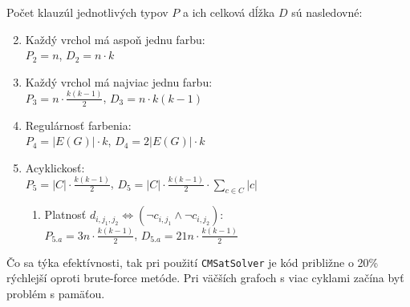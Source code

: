 \documentclass[11pt]{article}
\begin{document}
Počet klauzúl jednotlivých typov $P$ a ich celková dĺžka $D$ sú nasledovné:
\begin{enumerate}
    \setcounter{enumi}{1}
    \item Každý vrchol má aspoň jednu farbu:\\
    $P_2 = n$, $D_2 = n \cdot k$

    \item Každý vrchol má najviac jednu farbu:\\
    $P_3 = n \cdot \frac{k(k-1)}{2}$, $D_3 = n \cdot k(k-1)$

    \item Regulárnosť farbenia:\\
    $P_4 = |E(G)| \cdot k$, $D_4 = 2|E(G)| \cdot k$

    \item Acyklickosť:\\
    $P_5 = |C| \cdot \frac{k(k-1)}{2}$, $D_5 = |C| \cdot \frac{k(k-1)}{2} \cdot \sum_{c\in C} |c|$

    \begin{enumerate}
        \item Platnosť $d_{i, j_1, j_2} \Leftrightarrow \left(\neg c_{i, j_1} \land \neg c_{i, j_2}\right)$:\\
        $P_{5.a} = 3n \cdot\frac{k(k-1)}{2}$, $D_{5.a} = 21n\cdot \frac{k(k-1)}{2}$
    \end{enumerate}

\end{enumerate}

Čo sa týka efektívnosti, tak pri použití \verb|CMSatSolver| je kód približne o 20\% rýchlejší oproti brute-force metóde. Pri väčších grafoch s viac cyklami začína byť problém s pamäťou.
\end{document}
